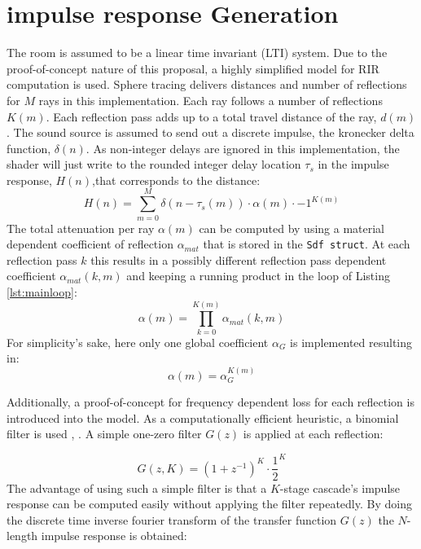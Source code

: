 \documentclass[twoside,a4paper]{article}
\begin{document}


\section{impulse response Generation}
The room is assumed to be a linear time invariant (LTI) system. Due to the proof-of-concept nature of this proposal, a highly simplified model for RIR computation is used. Sphere tracing delivers distances and number of reflections for $M$ rays in this implementation. Each ray follows a number of reflections $K(m)$. Each reflection pass adds up to a total travel distance of the ray, $d(m)$. The sound source is assumed to send out a discrete impulse, the kronecker delta function, $\delta(n)$. As non-integer delays are ignored in this implementation, the shader will just write to the rounded integer delay location $\tau_s$ in the impulse response, $H(n)$,that corresponds to the distance:
\begin{equation}
H(n) = \sum_{m=0}^M \delta(n-\tau_s(m))\cdot \alpha(m)\cdot -1^{K(m)}
\end{equation}
The total attenuation per ray $\alpha(m)$ can be computed by using a material dependent coefficient of reflection $\alpha_{mat}$ that is stored in the \texttt{Sdf struct}. At each reflection pass $k$ this results in a possibly different reflection pass dependent coefficient $\alpha_{mat}(k,m)$ and keeping a running product in the loop of Listing \ref{lst:mainloop}:
\begin{equation}
\alpha(m)=\prod_{k=0}^{K(m)} \alpha_{mat}(k,m)
\end{equation}
For simplicity's sake, here only one global coefficient $\alpha_G$ is implemented resulting in:
\begin{equation}
\alpha(m) = \alpha_G^{K(m)}
\end{equation}

Additionally, a proof-of-concept for frequency dependent loss for each reflection is introduced into the model. As a computationally efficient heuristic, a binomial filter is used \cite{aubury_binomial_1996}, \cite{derpanis_overview_nodate}. A simple one-zero filter $G(z)$ is applied at each reflection:

\begin{equation}
G(z,K) = (1+z^{-1})^K \cdot \frac{1}{2}^K
\end{equation}
The advantage of using such a simple filter is that a $K$-stage cascade's impulse response can be computed easily without applying the filter repeatedly. By doing the discrete time inverse fourier transform of the transfer function $G(z)$ the $N$-length impulse response is obtained:
\end{document}
